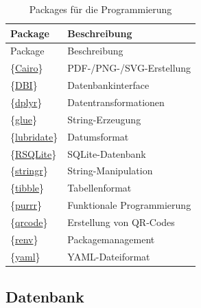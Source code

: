 \documentclass[
]{article}
\begin{document}
\begin{longtable}[]{@{}ll@{}}
\caption{\label{tab:pkg-programming} Packages für die Programmierung}\tabularnewline
\toprule
Package & Beschreibung \\
\midrule
\endfirsthead
\toprule
Package & Beschreibung \\
\midrule
\endhead
\{\href{https://cran.r-project.org/web/packages/Cairo/index.html}{Cairo}\} & PDF-/PNG-/SVG-Erstellung \\
\{\href{https://cran.r-project.org/web/packages/DBI/index.html}{DBI}\} & Datenbankinterface \\
\{\href{https://cran.r-project.org/web/packages/dplyr/index.html}{dplyr}\} & Datentransformationen \\
\{\href{https://cran.r-project.org/web/packages/glue/index.html}{glue}\} & String-Erzeugung \\
\{\href{https://cran.r-project.org/web/packages/lubridate/index.html}{lubridate}\} & Datumsformat \\
\{\href{https://cran.r-project.org/web/packages/RSQLite/index.html}{RSQLite}\} & SQLite-Datenbank \\
\{\href{https://cran.r-project.org/web/packages/stringr/index.html}{stringr}\} & String-Manipulation \\
\{\href{https://cran.r-project.org/web/packages/tibble/index.html}{tibble}\} & Tabellenformat \\
\{\href{https://cran.r-project.org/web/packages/purrr/index.html}{purrr}\} & Funktionale Programmierung \\
\{\href{https://cran.r-project.org/web/packages/qrcode/index.html}{qrcode}\} & Erstellung von QR-Codes \\
\{\href{https://cran.r-project.org/web/packages/renv/index.html}{renv}\} & Packagemanagement \\
\{\href{https://cran.r-project.org/web/packages/yaml/index.html}{yaml}\} & YAML-Dateiformat \\
\bottomrule
\end{longtable}

\hypertarget{datenbank-1}{%
\subsection{Datenbank}\label{datenbank-1}}
\end{document}
